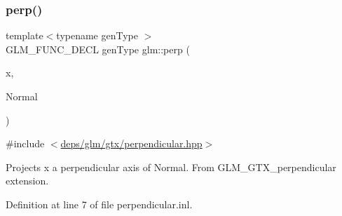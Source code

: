 \subsubsection{\texorpdfstring{perp()}{perp()}}
{\footnotesize\ttfamily template$<$typename gen\+Type $>$ \\
G\+L\+M\+\_\+\+F\+U\+N\+C\+\_\+\+D\+E\+CL gen\+Type glm\+::perp (\begin{DoxyParamCaption}\item[{gen\+Type const \&}]{x,  }\item[{gen\+Type const \&}]{Normal }\end{DoxyParamCaption})}



{\ttfamily \#include $<$\hyperlink{perpendicular_8hpp}{deps/glm/gtx/perpendicular.\+hpp}$>$}

Projects x a perpendicular axis of Normal. From G\+L\+M\+\_\+\+G\+T\+X\+\_\+perpendicular extension. 

Definition at line 7 of file perpendicular.\+inl.

